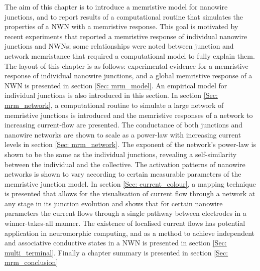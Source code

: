 The aim of this chapter is to introduce a memristive model for nanowire junctions, and to report results of a computational routine that simulates the properties of a NWN with a memristive response. This goal is motivated by recent experiments that reported a memristive response of individual nanowire junctions and NWNs\cite{bellew2014,scaling2018,manning2017}; some relationships were noted between junction and network memristance that required a computational model to fully explain them\cite{scaling2018}. The layout of this chapter is as follows: experimental evidence for a memristive response of individual nanowire junctions, and a global memristive response of a NWN is presented in section \ref{Sec: mrm_model}. An empirical model for individual junctions is also introduced in this section. In section \ref{Sec: mrm_network}, a computational routine to simulate a large network of memristive junctions is introduced and the memristive responses of a network to increasing current-flow are presented. The conductance of both junctions and nanowire networks are shown to scale as a power-law with increasing current levels in section \ref{Sec: mrm_network}. The exponent of the network's power-law is shown to be the same as the individual junctions, revealing a self-similarity between the individual and the collective. The activation patterns of nanowire networks is shown to vary according to certain measurable parameters of the memristive junction model. In section \ref{Sec: current_colour}, a mapping technique is presented that allows for the visualisation of current flow through a network at any stage in its junction evolution and shows that for certain nanowire parameters the current flows through a single pathway between electrodes in a winner-takes-all manner. The existence of localised current flows has potential application in neuromorphic computing, and as a method to achieve independent and associative conductive states in a NWN is presented in section \ref{Sec: multi_terminal}. Finally a chapter summary is presented in section \ref{Sec: mrm_conclusion}

